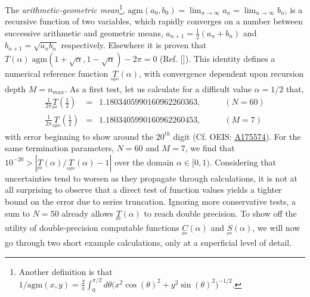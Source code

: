 \documentclass[nofootinbib,preprint]{revtex4-1}
\begin{document}
The \textit{arithmetic-geometric mean}\footnote{Another 
definition is that $1/\text{agm}(x,y) = \frac{2}{\pi} \int_{0}^{\pi/2}
d\theta\big(x^2 \cos(\theta)^2+y^2 \sin(\theta)^2\big)^{-1/2}$. }, 
$\text{agm}(a_0,b_0)=\lim_{n\rightarrow \infty}a_n =\lim_{n\rightarrow \infty}b_n$,
is a recursive function of two variables, which rapidly converges on a number between 
successive arithmetic and geometric means, $a_{n+1}=\tfrac{1}{2}(a_{n}+b_{n})$ and 
$b_{n+1}=\sqrt{a_{n} b_{n}}$ respectively. Elsewhere it is proven that 
$T(\alpha)\;\text{agm}(1+\sqrt{\alpha},1-\sqrt{\alpha})-2\pi=0$ (Ref. []). This 
identity defines a numerical reference function $\underset{^{agm}}{T}(\alpha)$, with 
convergence dependent upon recursion depth $M=n_{max}$. As a first test, let us 
calculate for a difficult value $\alpha=1/2$ that,
\begin{eqnarray}
\tfrac{1}{2\pi}\underset{^{pw}}{T}(\tfrac{1}{2}) &=& 1.1803405990160962260363,  \;\;\;\;\;\;\;\;\;\; (N=60)    \nonumber \\
\tfrac{1}{2\pi}\underset{^{agm}}{T}(\tfrac{1}{2}) &=& 1.1803405990160962260453, \;\;\;\;\;\;\;\;\;\; (M=7)    \nonumber 
\end{eqnarray}
with error beginning to show around the $20^{th}$ digit (Cf. OEIS: 
\href{https://oeis.org/A175574}{A175574}). For the same termination parameters,
$N=60$ and $M=7$, we find that 
$10^{-20} > |\underset{^{pw}}{T}(\alpha)/\underset{^{agm}}{T}(\alpha)-1|$
over the domain $\alpha \in [0,1)$. Considering that uncertainties tend to 
worsen as they propagate through calculations, it is not at all surprising to 
observe that a direct test of function values yields a tighter bound on the 
error due to series truncation. Ignoring more conservative tests, a 
sum to $N=50$ already allows $\underset{^{pw}}{T}(\alpha)$ to reach double 
precision. To show off the utility of double-precision computable functions 
$\underset{^{pw}}{C}(\alpha)$ and $\underset{^{pw}}{S}(\alpha)$, we
will now go through two short example calculations, only at a superficial 
level of detail. 
\end{document}
